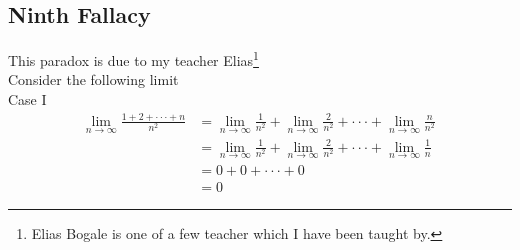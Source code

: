 \documentclass[paper=a4, fontsize=12pt]{scrartcl} %
\theoremstyle{definition}
\theoremstyle{remark}
\begin{document}

\subsection*{\textbf{Ninth Fallacy}}
This paradox is due to my teacher Elias\footnote{Elias Bogale is one of a few teacher which I have been taught by.} \\
Consider the following limit\\
Case I
\begin{align*}
 \lim_{n\rightarrow \infty}\frac{1+2+\cdot\cdot\cdot+n}{n^2} & = \lim_{n\rightarrow \infty}\frac{1}{n^2}+ \lim_{n\rightarrow \infty}\frac{2}{n^2}+\cdot\cdot\cdot+\lim_{n\rightarrow \infty}\frac{n}{n^2}\, \\
                  & = \lim_{n\rightarrow \infty}\frac{1}{n^2}+ \lim_{n\rightarrow \infty}\frac{2}{n^2}+\cdot\cdot\cdot+\lim_{n\rightarrow \infty}\frac{1}{n}\, \\
               & =0+ 0+\cdot\cdot\cdot+0\, \\
               & = 0 \,
\end{align*}
\end{document}
